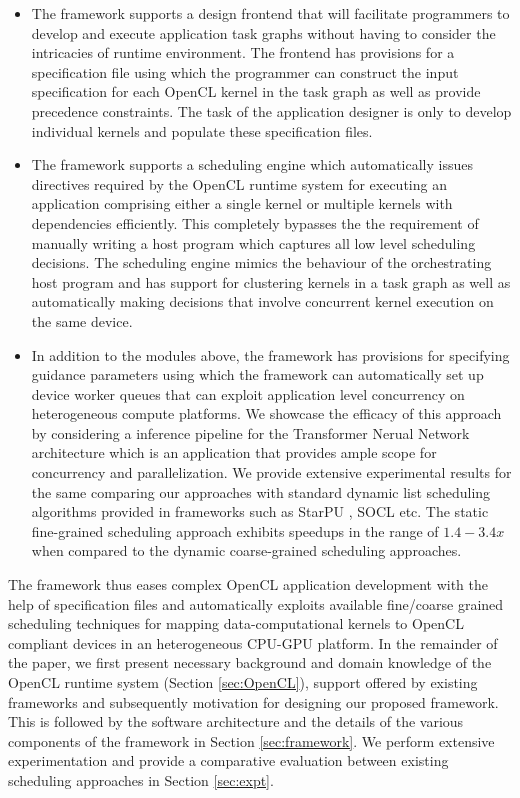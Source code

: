 \begin{itemize}
    \item The framework supports a design frontend that will facilitate programmers to develop and execute application task graphs without having to consider the intricacies of runtime environment. The frontend has provisions for a specification file using which the programmer can construct the input specification for each OpenCL kernel in the task graph as well as provide  precedence constraints.  The task of the application designer is only to develop individual kernels and populate these specification files.
    \item The framework supports a scheduling engine which automatically issues directives required by the OpenCL runtime system for executing an application comprising either a single kernel or multiple kernels with dependencies efficiently. This completely bypasses the the requirement of manually writing a host program which captures all low level scheduling decisions. The scheduling engine  mimics the behaviour of the orchestrating host program and has support for clustering kernels in a task graph as well as automatically making decisions that involve concurrent kernel execution on the same device.
    \item In addition to the modules above, the framework has provisions for specifying guidance parameters using which the framework can automatically set up device worker queues that can exploit application level concurrency on heterogeneous compute platforms. We showcase the efficacy of this approach by considering a inference pipeline for the Transformer Nerual Network architecture \cite{DBLP:journals/corr/VaswaniSPUJGKP17} which is an application that provides ample scope for concurrency and parallelization. We provide extensive experimental results for the same comparing our approaches with standard dynamic list scheduling algorithms provided in frameworks such as StarPU \cite{augonnet2011starpu}, SOCL \cite{henry2014toward} etc. The static fine-grained scheduling approach exhibits  speedups in the range of $1.4-3.4x$ when compared to the dynamic coarse-grained scheduling approaches.     
\end{itemize}

The framework thus eases complex OpenCL application development with the help of specification files and automatically exploits available fine/coarse grained scheduling techniques for mapping data-computational kernels to OpenCL compliant devices in an heterogeneous CPU-GPU platform. In the remainder of the paper, we first present necessary background and domain knowledge of the OpenCL runtime system (Section \ref{sec:OpenCL}), support offered by existing frameworks and subsequently motivation for designing our proposed framework. This is followed by the software architecture  and the details of the various components of the framework in Section \ref{sec:framework}. We perform extensive experimentation and provide a comparative evaluation between existing scheduling approaches in Section \ref{sec:expt}. 
   
